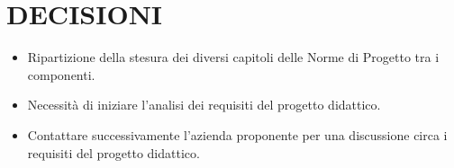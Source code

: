 \documentclass[5pt]{article}
\begin{document}
\section{DECISIONI}
\begin{itemize}
    \item Ripartizione della stesura dei diversi capitoli delle Norme di Progetto tra i componenti.
    \item Necessità di iniziare l'analisi dei requisiti del progetto didattico.
    \item Contattare successivamente l'azienda proponente per una discussione circa i requisiti del progetto didattico.
\end{itemize}
\end{document}
